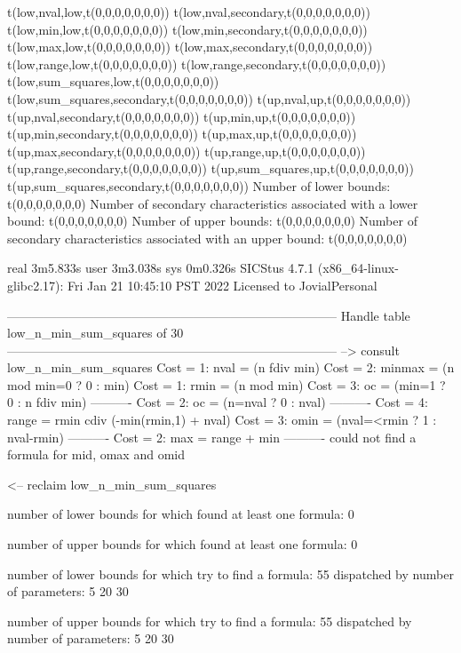 t(low,nval,low,t(0,0,0,0,0,0,0))
t(low,nval,secondary,t(0,0,0,0,0,0,0))
t(low,min,low,t(0,0,0,0,0,0,0))
t(low,min,secondary,t(0,0,0,0,0,0,0))
t(low,max,low,t(0,0,0,0,0,0,0))
t(low,max,secondary,t(0,0,0,0,0,0,0))
t(low,range,low,t(0,0,0,0,0,0,0))
t(low,range,secondary,t(0,0,0,0,0,0,0))
t(low,sum_squares,low,t(0,0,0,0,0,0,0))
t(low,sum_squares,secondary,t(0,0,0,0,0,0,0))
t(up,nval,up,t(0,0,0,0,0,0,0))
t(up,nval,secondary,t(0,0,0,0,0,0,0))
t(up,min,up,t(0,0,0,0,0,0,0))
t(up,min,secondary,t(0,0,0,0,0,0,0))
t(up,max,up,t(0,0,0,0,0,0,0))
t(up,max,secondary,t(0,0,0,0,0,0,0))
t(up,range,up,t(0,0,0,0,0,0,0))
t(up,range,secondary,t(0,0,0,0,0,0,0))
t(up,sum_squares,up,t(0,0,0,0,0,0,0))
t(up,sum_squares,secondary,t(0,0,0,0,0,0,0))
Number of lower bounds:                                             t(0,0,0,0,0,0,0)
Number of secondary characteristics associated with a lower bound:  t(0,0,0,0,0,0,0)
Number of upper bounds:                                             t(0,0,0,0,0,0,0)
Number of secondary characteristics associated with an upper bound: t(0,0,0,0,0,0,0)

real	3m5.833s
user	3m3.038s
sys	0m0.326s
SICStus 4.7.1 (x86_64-linux-glibc2.17): Fri Jan 21 10:45:10 PST 2022
Licensed to JovialPersonal


--------------------------------------------------------------------------------
Handle table low_n_min_sum_squares of 30
--------------------------------------------------------------------------------
--> consult low_n_min_sum_squares
Cost =  1:  nval   = (n fdiv min)
Cost =  2:  minmax = (n mod min=0 ? 0 : min)
Cost =  1:  rmin   = (n mod min)
Cost =  3:  oc     = (min=1 ? 0 : n fdiv min)
----------
Cost =  2:  oc     = (n=nval ? 0 : nval)
----------
Cost =  4:  range  = rmin cdiv (-min(rmin,1) + nval)
Cost =  3:  omin   = (nval=<rmin ? 1 : nval-rmin)
----------
Cost =  2:  max    = range + min
----------
could not find a formula for mid, omax and omid

<-- reclaim low_n_min_sum_squares

number of lower bounds for which found at least one formula: 0

number of upper bounds for which found at least one formula: 0

number of lower bounds for which try to find a formula: 55
dispatched by number of parameters: 5  20  30

number of upper bounds for which try to find a formula: 55
dispatched by number of parameters: 5  20  30

